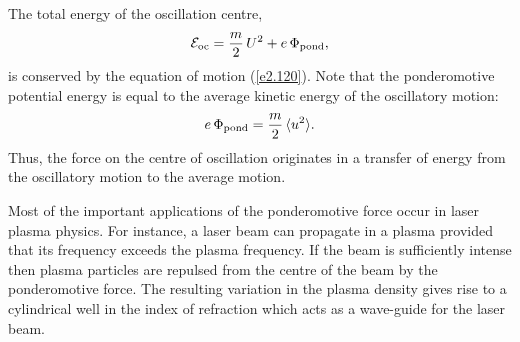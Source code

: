 The total energy of the oscillation centre,
\begin{equation}
{\cal E}_{\rm oc} = \frac{m}{2}\,U^2 +e\,{\Phi}_{\rm pond},
\end{equation}
is conserved by the equation of motion (\ref{e2.120}). Note that the ponderomotive
potential energy is equal to the average kinetic energy of the
oscillatory motion:
\begin{equation}
e\,{\Phi}_{\rm pond} = \frac{m}{2}\,\langle u^2\rangle.
\end{equation}
Thus, the force on the centre of oscillation originates in a transfer of
energy from the oscillatory motion to the average motion.

Most of the important applications of the ponderomotive force occur in laser
plasma physics. 
For instance, a laser beam can propagate in a plasma provided that
its frequency exceeds the plasma frequency. If the beam is sufficiently
intense then plasma particles are repulsed from the centre of the
beam by the ponderomotive force. The resulting variation in the plasma
density gives rise to a cylindrical well in the index of refraction
which acts as a wave-guide for the laser beam.